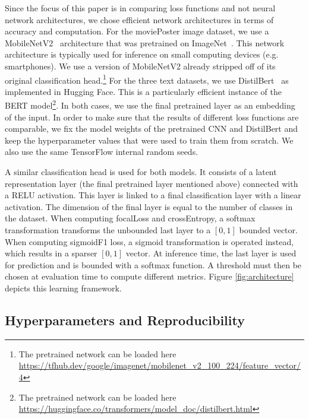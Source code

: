 Since the focus of this paper is in comparing loss functions and not neural network architectures, we chose efficient network architectures in terms of accuracy and computation.
For the moviePoster image dataset, we use a MobileNetV2~\cite{mobileNet} architecture that was pretrained on ImageNet~\cite{imagenet}. This network architecture is typically used for inference on small computing devices (e.g. smartphones). We use a version of MobileNetV2 already stripped off of its original classification head.\footnote{The pretrained network can be loaded here \url{https://tfhub.dev/google/imagenet/mobilenet_v2_100_224/feature_vector/4}}
For the three text datasets, we use DistilBert~\cite{distilBert} as implemented in Hugging Face. This is a particularly efficient instance of the BERT model\footnote{The pretrained network can be loaded here \url{https://huggingface.co/transformers/model_doc/distilbert.html}}. 
In both cases, we use the final pretrained layer as an embedding of the input. In order to make sure that the results of different loss functions are comparable, we fix the model weights of the pretrained CNN and DistilBert and keep the hyperparameter values that were used to train them from scratch. We also use the same TensorFlow internal random seeds.

A similar classification head is used for both models. It consists of a latent representation layer (the final pretrained layer mentioned above) connected with a RELU activation. This layer is linked to a final classification layer with a linear activation. The dimension of the final layer is equal to the number of classes in the dataset. When computing focalLoss and crossEntropy, a softmax transformation transforms the unbounded last layer to a $[0,1]$ bounded vector. When computing sigmoidF1 loss, a sigmoid transformation is operated instead, which results in a sparser $[0,1]$ vector. At inference time, the last layer is used for prediction and is bounded with a softmax function. A threshold must then be chosen at evaluation time to compute different metrics. Figure \ref{fig:architecture} depicts this learning framework.


\subsection{Hyperparameters and Reproducibility}

